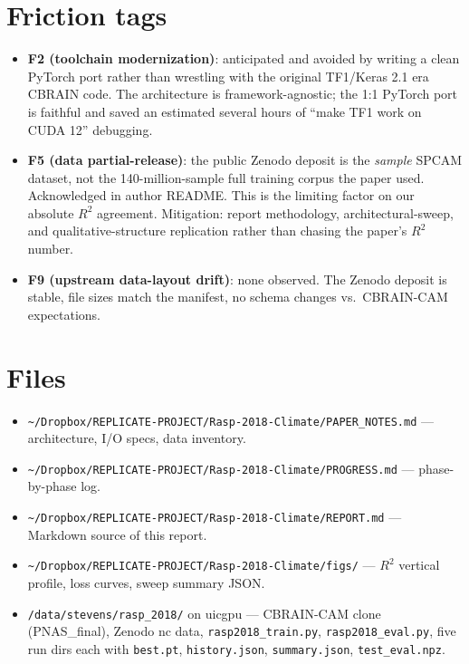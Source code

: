 \documentclass[11pt]{article}
\begin{document}
\section{Friction tags}
\begin{itemize}
\item \textbf{F2 (toolchain modernization)}: anticipated and avoided by
  writing a clean PyTorch port rather than wrestling with the original
  TF1/Keras 2.1 era CBRAIN code. The architecture is framework-agnostic;
  the 1:1 PyTorch port is faithful and saved an estimated several hours of
  ``make TF1 work on CUDA 12'' debugging.
\item \textbf{F5 (data partial-release)}: the public Zenodo deposit is the
  \emph{sample} SPCAM dataset, not the 140-million-sample full training
  corpus the paper used. Acknowledged in author README. This is the limiting
  factor on our absolute $R^2$ agreement. Mitigation: report methodology,
  architectural-sweep, and qualitative-structure replication rather than
  chasing the paper's $R^2$ number.
\item \textbf{F9 (upstream data-layout drift)}: none observed. The Zenodo
  deposit is stable, file sizes match the manifest, no schema changes vs.\
  CBRAIN-CAM expectations.
\end{itemize}

\section{Files}
\begin{itemize}
\item \verb|~/Dropbox/REPLICATE-PROJECT/Rasp-2018-Climate/PAPER_NOTES.md|
  --- architecture, I/O specs, data inventory.
\item \verb|~/Dropbox/REPLICATE-PROJECT/Rasp-2018-Climate/PROGRESS.md|
  --- phase-by-phase log.
\item \verb|~/Dropbox/REPLICATE-PROJECT/Rasp-2018-Climate/REPORT.md|
  --- Markdown source of this report.
\item \verb|~/Dropbox/REPLICATE-PROJECT/Rasp-2018-Climate/figs/|
  --- $R^2$ vertical profile, loss curves, sweep summary JSON.
\item \verb|/data/stevens/rasp_2018/| on uicgpu --- CBRAIN-CAM clone
  (PNAS\_final), Zenodo nc data, \texttt{rasp2018\_train.py},
  \texttt{rasp2018\_eval.py}, five run dirs each with
  \texttt{best.pt}, \texttt{history.json}, \texttt{summary.json},
  \texttt{test\_eval.npz}.
\end{itemize}
\end{document}
